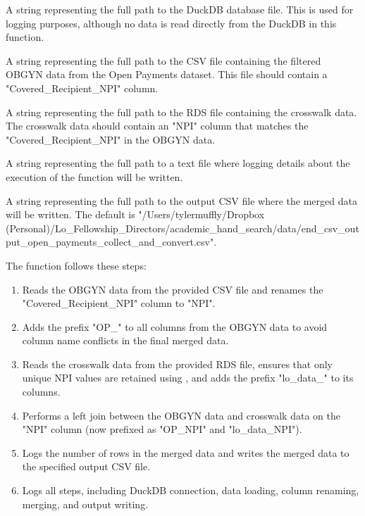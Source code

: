 \documentclass[a4paper]{book}
\begin{document}
%
\begin{Arguments}
\begin{ldescription}
\item[\code{duckdb\_file\_path}] A string representing the full path to the DuckDB database file. This is used for logging purposes, although no data is read directly from the DuckDB in this function.

\item[\code{specialty\_csv\_path}] A string representing the full path to the CSV file containing the filtered OBGYN data from the Open Payments dataset. This file should contain a "Covered\_Recipient\_NPI" column.

\item[\code{crosswalk\_rds\_path}] A string representing the full path to the RDS file containing the crosswalk data. The crosswalk data should contain an "NPI" column that matches the "Covered\_Recipient\_NPI" in the OBGYN data.

\item[\code{log\_path}] A string representing the full path to a text file where logging details about the execution of the function will be written.

\item[\code{output\_csv}] A string representing the full path to the output CSV file where the merged data will be written. The default is "/Users/tylermuffly/Dropbox (Personal)/Lo\_Fellowship\_Directors/academic\_hand\_search/data/end\_csv\_output\_open\_payments\_collect\_and\_convert.csv".
\end{ldescription}
\end{Arguments}
%
\begin{Details}
The function follows these steps:
\begin{enumerate}

\item{} Reads the OBGYN data from the provided CSV file and renames the "Covered\_Recipient\_NPI" column to "NPI".
\item{} Adds the prefix "OP\_" to all columns from the OBGYN data to avoid column name conflicts in the final merged data.
\item{} Reads the crosswalk data from the provided RDS file, ensures that only unique NPI values are retained using , and adds the prefix "lo\_data\_" to its columns.
\item{} Performs a left join between the OBGYN data and crosswalk data on the "NPI" column (now prefixed as "OP\_NPI" and "lo\_data\_NPI").
\item{} Logs the number of rows in the merged data and writes the merged data to the specified output CSV file.
\item{} Logs all steps, including DuckDB connection, data loading, column renaming, merging, and output writing.

\end{enumerate}

\end{Details}
\end{document}
